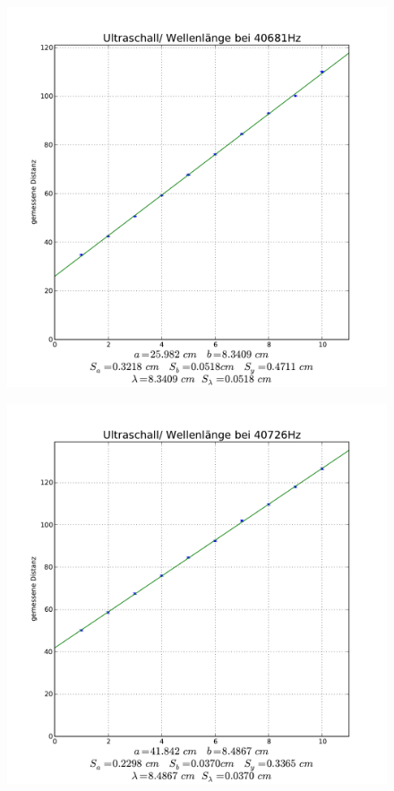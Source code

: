 \documentclass[12pt,a4paper]{article}
\begin{document}
\begin{figure}[hbt]
	\centering
	\includegraphics[width=15cm]{40681Hz}
	\label{Bild1}
\end{figure}
\begin{figure}[hbt]
	\centering
	\includegraphics[width=15cm]{40726Hz}
	\label{Bild2}
\end{figure}
\end{document}
